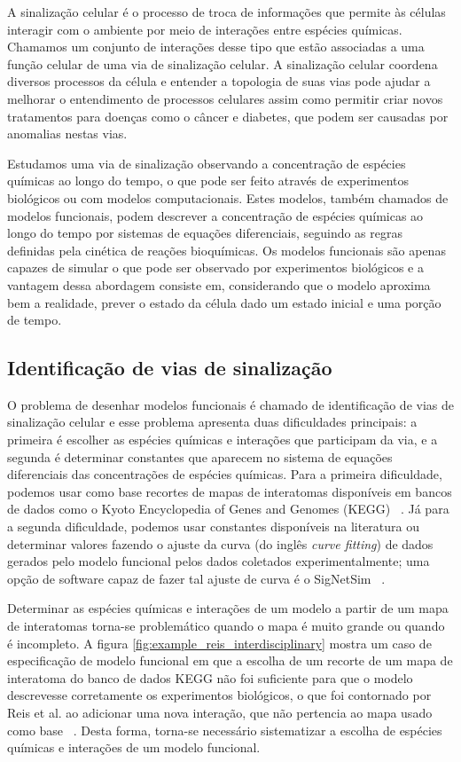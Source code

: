 \documentclass[12pt]{article}
\begin{document}
A sinalização celular é o processo de troca de informações que permite
às células interagir com o ambiente por meio de interações entre
espécies químicas. Chamamos um conjunto de interações desse tipo que 
estão associadas a uma função celular de uma via de sinalização celular.
A sinalização celular coordena diversos processos da célula e entender 
a topologia de suas vias pode ajudar a melhorar o entendimento de 
processos celulares assim como permitir criar novos tratamentos para 
doenças como o câncer e diabetes, que podem ser causadas por anomalias 
nestas vias.

Estudamos uma via de sinalização observando a concentração de espécies
químicas ao longo do tempo, o que pode ser feito através de experimentos
biológicos ou com modelos computacionais. Estes modelos, também
chamados de modelos funcionais, podem descrever a concentração de 
espécies químicas ao longo do tempo por sistemas de equações 
diferenciais, seguindo as regras definidas pela cinética de reações 
bioquímicas. Os modelos funcionais são apenas capazes de simular o que 
pode ser observado por experimentos biológicos e a vantagem dessa 
abordagem consiste em, considerando que o modelo aproxima bem a 
realidade, prever o estado da célula dado um estado inicial e uma porção
de tempo.

\subsection{Identificação de vias de sinalização}
O problema de desenhar modelos funcionais é chamado de identificação de
vias de sinalização celular e esse problema apresenta duas dificuldades
principais: a primeira é escolher as espécies químicas e interações que
participam da via, e a segunda é determinar constantes que aparecem no
sistema de equações diferenciais das concentrações de espécies químicas.
Para a primeira dificuldade, podemos usar como base recortes de mapas de
interatomas disponíveis em bancos de dados como o Kyoto Encyclopedia of 
Genes and Genomes (KEGG) ~\cite{Kanehisa2000kegg}. Já para a segunda
dificuldade, podemos usar constantes disponíveis na literatura ou 
determinar valores fazendo o ajuste da curva (do inglês \emph{curve 
fitting}) de dados gerados pelo modelo funcional pelos dados coletados
experimentalmente; uma opção de software capaz de fazer tal ajuste de
curva é o SigNetSim ~\cite{Noel2017SigNetSim}.

Determinar as espécies químicas e interações de um modelo a partir de um
mapa de interatomas torna-se problemático quando o mapa é muito grande 
ou quando é incompleto. A figura 
\ref{fig:example_reis_interdisciplinary} mostra um caso de especificação
de modelo funcional em que a escolha de um recorte de um mapa de 
interatoma do banco de dados KEGG não foi suficiente para que o modelo 
descrevesse corretamente os experimentos biológicos, o que foi 
contornado por Reis et al. ao adicionar uma nova interação, que não 
pertencia ao mapa usado como base ~\cite{Reis2017interdisciplinary}.
Desta forma, torna-se necessário sistematizar a escolha de espécies 
químicas e interações de um modelo funcional.
\end{document}
